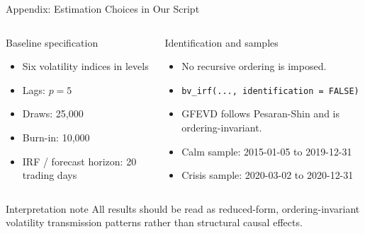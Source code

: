 \documentclass[10pt, aspectratio=169]{beamer}
\begin{document}
\begin{frame}{Appendix: Estimation Choices in Our Script}
\small
\begin{columns}[T,onlytextwidth]
  \begin{block}{Baseline specification}
  \begin{itemize}
    \item Six volatility indices in levels
    \item Lags: $p=5$
    \item Draws: 25{,}000
    \item Burn-in: 10{,}000
    \item IRF / forecast horizon: 20 trading days
  \end{itemize}
  \end{block}

  \begin{block}{Identification and samples}
  \begin{itemize}
    \item No recursive ordering is imposed.
    \item \texttt{bv\_irf(..., identification = FALSE)}
    \item GFEVD follows Pesaran-Shin and is ordering-invariant.
    \item Calm sample: 2015-01-05 to 2019-12-31
    \item Crisis sample: 2020-03-02 to 2020-12-31
  \end{itemize}
  \end{block}
\end{columns}

\vspace{0.4em}
\begin{alertblock}{Interpretation note}
All results should be read as reduced-form, ordering-invariant volatility transmission patterns rather than structural causal effects.
\end{alertblock}
\end{frame}
\end{document}
